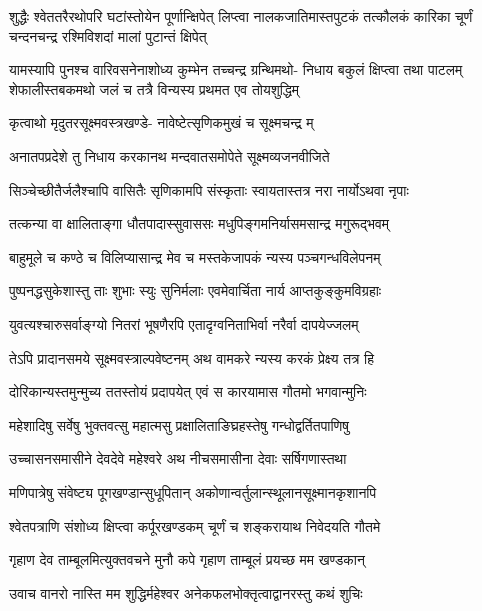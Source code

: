 {शुद्धैः श्वेततरैरथोपरि घटांस्तोयेन पूर्णान्क्षिपेत्}
{लिप्त्वा नालकजातिमास्तपुटकं तत्कौलकं कारिका}
{चूर्णं चन्दनचन्द्र रश्मिविशदां मालां पुटान्तं क्षिपेत्}

\twolineshloka
{यामस्यापि पुनश्च वारिवसनेनाशोध्य कुम्भेन तच्चन्द्र ग्रन्थिमथो-}
{निधाय बकुलं क्षिप्त्वा तथा पाटलम्}%
शेफालीस्तबकमथो जलं च तत्रै
विन्यस्य प्रथमत एव तोयशुद्धिम्

\twolineshloka
{कृत्वाथो मृदुतरसूक्ष्मवस्त्रखण्डे-}
{नावेष्टेत्सृणिकमुखं च सूक्ष्मचन्द्र म्}%

\twolineshloka
{अनातपप्रदेशे तु निधाय करकानथ}
{मन्दवातसमोपेते सूक्ष्मव्यजनवीजिते}%

\twolineshloka
{सिञ्चेच्छीतैर्जलैश्चापि वासितैः सृणिकामपि}
{संस्कृताः स्वायतास्तत्र नरा नार्योऽथवा नृपाः}%

\twolineshloka
{तत्कन्या वा क्षालिताङ्गा धौतपादास्सुवाससः}
{मधुपिङ्गमनिर्यासमसान्द्र मगुरूद्भवम्}%

\twolineshloka
{बाहुमूले च कण्ठे च विलिप्यासान्द्र मेव च}
{मस्तकेजापकं न्यस्य पञ्चगन्धविलेपनम्}%

\twolineshloka
{पुष्पनद्धसुकेशास्तु ताः शुभाः स्युः सुनिर्मलाः}
{एवमेवार्चिता नार्य आप्तकुङ्कुमविग्रहाः}%

\twolineshloka
{युवत्यश्चारुसर्वाङ्ग्यो नितरां भूषणैरपि}
{एतादृग्वनिताभिर्वा नरैर्वा दापयेज्जलम्}%

\twolineshloka
{तेऽपि प्रादानसमये सूक्ष्मवस्त्राल्पवेष्टनम्}
{अथ वामकरे न्यस्य करकं प्रेक्ष्य तत्र हि}%

\twolineshloka
{दोरिकान्यस्तमुन्मुच्य ततस्तोयं प्रदापयेत्}
{एवं स कारयामास गौतमो भगवान्मुनिः}%

\twolineshloka
{महेशादिषु सर्वेषु भुक्तवत्सु महात्मसु}
{प्रक्षालिताङिघ्रहस्तेषु गन्धोद्वर्तितपाणिषु}%

\twolineshloka
{उच्चासनसमासीने देवदेवे महेश्वरे}
{अथ नीचसमासीना देवाः सर्षिगणास्तथा}%

\twolineshloka
{मणिपात्रेषु संवेष्ट्य पूगखण्डान्सुधूपितान्}
{अकोणान्वर्तुलान्स्थूलानसूक्ष्मानकृशानपि}%

\twolineshloka
{श्वेतपत्राणि संशोध्य क्षिप्त्वा कर्पूरखण्डकम्}
{चूर्णं च शङ्करायाथ निवेदयति गौतमे}%

\twolineshloka
{गृहाण देव ताम्बूलमित्युक्तवचने मुनौ}
{कपे गृहाण ताम्बूलं प्रयच्छ मम खण्डकान्}%

\twolineshloka
{उवाच वानरो नास्ति मम शुद्धिर्महेश्वर}
{अनेकफलभोक्तृत्वाद्वानरस्तु कथं शुचिः}%

